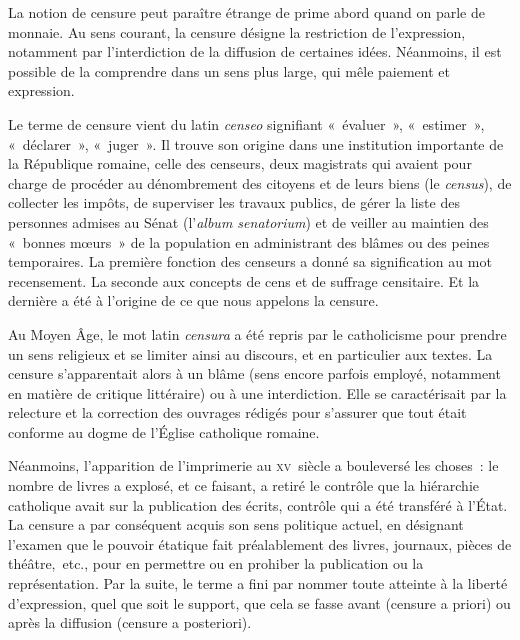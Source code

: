 La notion de censure peut paraître étrange de prime abord quand on parle de monnaie. Au sens courant, la censure désigne la restriction de l'expression, notamment par l'interdiction de la diffusion de certaines idées. Néanmoins, il est possible de la comprendre dans un sens plus large, qui mêle paiement et expression.

Le terme de censure vient du latin \emph{censeo} signifiant «~évaluer~», «~estimer~», «~déclarer~», «~juger~». Il trouve son origine dans une institution importante de la République romaine, celle des censeurs, deux magistrats qui avaient pour charge de procéder au dénombrement des citoyens et de leurs biens (le \emph{census}), de collecter les impôts, de superviser les travaux publics, de gérer la liste des personnes admises au Sénat (l'\emph{album senatorium}) et de veiller au maintien des «~bonnes mœurs~» de la population en administrant des blâmes ou des peines temporaires. La première fonction des censeurs a donné sa signification au mot recensement. La seconde aux concepts de cens et de suffrage censitaire. Et la dernière a été à l'origine de ce que nous appelons la censure.

Au Moyen Âge, le mot latin \emph{censura} a été repris par le catholicisme pour prendre un sens religieux et se limiter ainsi au discours, et en particulier aux textes. La censure s'apparentait alors à un blâme (sens encore parfois employé, notamment en matière de critique littéraire) ou à une interdiction. Elle se caractérisait par la relecture et la correction des ouvrages rédigés pour s'assurer que tout était conforme au dogme de l'Église catholique romaine.

Néanmoins, l'apparition de l'imprimerie au \textsc{xv}\ieme{}~siècle a bouleversé les choses~: le nombre de livres a explosé, et ce faisant, a retiré le contrôle que la hiérarchie catholique avait sur la publication des écrits, contrôle qui a été transféré à l'État. La censure a par conséquent acquis son sens politique actuel, en désignant l'examen que le pouvoir étatique fait préalablement des livres, journaux, pièces de théâtre,~etc., pour en permettre ou en prohiber la publication ou la représentation. Par la suite, le terme a fini par nommer toute atteinte à la liberté d'expression, quel que soit le support, que cela se fasse avant (censure a priori) ou après la diffusion (censure a posteriori).

